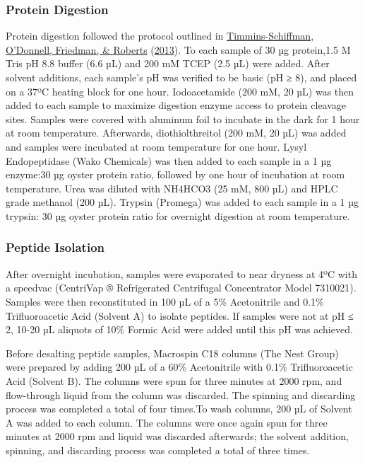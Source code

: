 \documentclass [11pt, proquest] {uwthesis}[2015/03/03]
\begin{document}
\hypertarget{protein-digestion}{%
\subsubsection{Protein Digestion}\label{protein-digestion}}

Protein digestion followed the protocol outlined in \protect\hyperlink{ref-Timmins-Schiffman2013}{Timmins-Schiffman, O'Donnell, Friedman, \& Roberts} (\protect\hyperlink{ref-Timmins-Schiffman2013}{2013}). To each sample of 30 µg protein,1.5 M Tris pH 8.8 buffer (6.6 µL) and 200 mM TCEP (2.5 µL) were added. After solvent additions, each sample's pH was verified to be basic (pH ≥ 8), and placed on a 37ºC heating block for one hour. Iodoacetamide (200 mM, 20 µL) was then added to each sample to maximize digestion enzyme access to protein cleavage sites. Samples were covered with aluminum foil to incubate in the dark for 1 hour at room temperature. Afterwards, diothiolthreitol (200 mM, 20 µL) was added and samples were incubated at room temperature for one hour. Lysyl Endopeptidase (Wako Chemicals) was then added to each sample in a 1 µg enzyme:30 µg oyster protein ratio, followed by one hour of incubation at room temperature. Urea was diluted with NH4HCO3 (25 mM, 800 µL) and HPLC grade methanol (200 µL). Trypsin (Promega) was added to each sample in a 1 µg trypsin: 30 µg oyster protein ratio for overnight digestion at room temperature.

\hypertarget{peptide-isolation}{%
\subsubsection{Peptide Isolation}\label{peptide-isolation}}

After overnight incubation, samples were evaporated to near dryness at 4ºC with a speedvac (CentriVap ® Refrigerated Centrifugal Concentrator Model 7310021). Samples were then reconstituted in 100 µL of a 5\% Acetonitrile and 0.1\% Trifluoroacetic Acid (Solvent A) to isolate peptides. If samples were not at pH ≤ 2, 10-20 µL aliquots of 10\% Formic Acid were added until this pH was achieved.

Before desalting peptide samples, Macrospin C18 columns (The Nest Group) were prepared by adding 200 µL of a 60\% Acetonitrile with 0.1\% Trifluoroacetic Acid (Solvent B). The columns were spun for three minutes at 2000 rpm, and flow-through liquid from the column was discarded. The spinning and discarding process was completed a total of four times.To wash columns, 200 µL of Solvent A was added to each column. The columns were once again spun for three minutes at 2000 rpm and liquid was discarded afterwards; the solvent addition, spinning, and discarding process was completed a total of three times.
\end{document}
